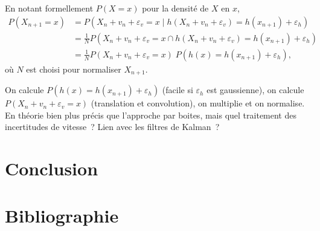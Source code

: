 \documentclass[11pt,oneside]{article}
\begin{document}
  \begin{center}
  \end{center}
  \begin{center}
  \end{center}

  En notant formellement $P(X=x)$ pour la densité de $X$ en $x$,
  \begin{align*}
    P(X_{n+1} = x) &= P(X_{n} + v_{n} + \varepsilon_{v} = x \;\Big|\;
    h(X_{n} + v_{n} + \varepsilon_{v}) = h(x_{n+1}) + 
                     \varepsilon_{h})\\
    &= \frac 1 N P(X_{n} + v_{n} + \varepsilon_{v} = x \cap
    h(X_{n} + v_{n} + \varepsilon_{v}) = h(x_{n+1}) + \varepsilon_{h})\\
    &= \frac 1 N P(X_{n} + v_{n} + \varepsilon_{v} = x) \; P(h(x) = h(x_{n+1}) + \varepsilon_{h}),
  \end{align*}
  où $N$ est choisi pour normaliser $X_{n+1}$.

  On calcule $P(h(x) = h(x_{n+1}) + \varepsilon_{h})$ (facile si
  $\varepsilon_{h}$ est gaussienne), on calcule $P(X_{n} + v_{n} +
  \varepsilon_{v} = x)$ (translation et convolution), on multiplie et on
  normalise. En théorie bien plus précis que l'approche par boites,
  mais quel traitement des incertitudes de vitesse~? Lien avec les
  filtres de Kalman~?
\section{Conclusion}
\section{Bibliographie}
\end{document}
